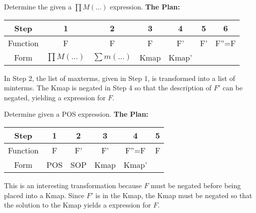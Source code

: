 \begin{process}{Determine the \POSmin given a $\prod M(\ldots)$ expression.}
\label{process:minimizationProdToPOS}
\textbf{The Plan:}

\begin{tabular}{|c|c|c|c|c|c|c|}\hline
Step	  & 1  & 2  & 3  & 4  & 5  & 6\\ \hline
Function  & F  & F  & F  & F' & F' & F''=F \\ \hline
Form	  & $\prod M(\ldots)$ & $\sum m(\ldots)$ & Kmap & Kmap' & \SOPmin & \POSmin \\ \hline
\end{tabular}
\vspace{0.2cm}

In Step 2, the list of maxterms, given in Step 1, is transformed into a list
of minterms.  The Kmap is negated in Step 4 so that the \SOPmin description
of $F'$ can be negated, yielding a \POSmin expression for $F$.
\end{process}

\begin{process}{Determine \SOPmin given a POS expression.}
\label{process:minimizationPOSToSOP}
\textbf{The Plan:}

\begin{tabular}{|c|c|c|c|c|c|}\hline
Step	  & 1  & 2  & 3  & 4  & 5  \\ \hline
Function  & F  & F'  & F'  & F''=F &  F \\ \hline
Form	  & POS & SOP & Kmap & Kmap' & \SOPmin \\ \hline
\end{tabular}
\vspace{0.2cm}

This is an interesting transformation because $F$ must be negated
before being placed into a Kmap.  Since $F'$ is in the Kmap, the
Kmap must be negated so that the solution to the Kmap
yields a \SOPmin expression for $F$.
\end{process}

